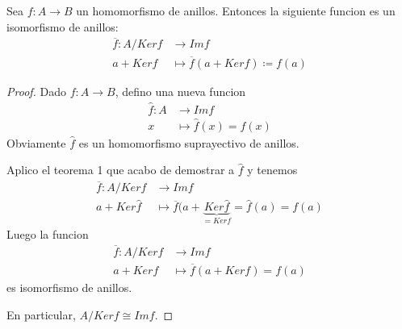 \begin{corollary}
	Sea \(f \colon A \to B \) un homomorfismo de anillos. Entonces la siguiente funcion es un isomorfismo de anillos:
	\[
		\begin{aligned}
			\overline{f} \colon A/Kerf & \longrightarrow Imf                                 \\
			a + Kerf                   & \longmapsto \overline{f} (a + Kerf) \coloneqq f(a)
		\end{aligned}
	\]
\end{corollary}
\begin{proof}
	Dado \(f \colon A \to B \), defino una nueva funcion
	\[
		\begin{aligned}
			\hat{f}\colon A & \longrightarrow Imf              \\
			x               & \longmapsto \hat{f}(x ) = f(x )
		\end{aligned}
	\]
	Obviamente \(\hat{f }\) es un homomorfismo suprayectivo de anillos.
	
	Aplico el teorema 1 que acabo de demostrar a \(\hat{f }\) y tenemos
	\[
		\begin{aligned}
			\overline{f} \colon A/Kerf & \longrightarrow Imf                                                                  \\
			a + Ker\hat{f}             & \longmapsto \overline{f} (a + \underbrace{Ker\hat{f}}_{= Kerf} = \hat{f}(a ) = f(a)
		\end{aligned}
	\]
	Luego la funcion
	\[
		\begin{aligned}
			\overline{f} \colon A/Kerf & \longrightarrow Imf                          \\
			a + Kerf                   & \longmapsto \overline{f} (a + Kerf ) = f(a)
		\end{aligned}
	\]
	es isomorfismo de anillos.
	
	En particular, \(A/Kerf \cong Imf \).
\end{proof}

